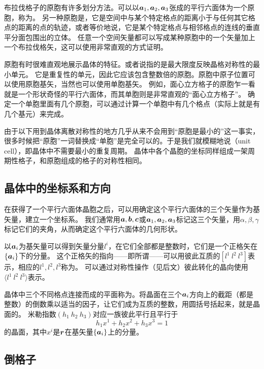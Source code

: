 布拉伐格子的原胞有许多划分方法。可以以$\vb*{a}_1, \vb*{a}_2, \vb*{a}_3$张成的平行六面体为一个原胞，称为。
另一种原胞是，它是空间中与某个特定格点的距离小于与任何其它格点的距离的点的轨迹，或者等价地说，它是某个特定格点与相邻格点的连线的垂直平分面包围出的立体。
任意一个空间矢量都可以写成某种原胞中的一个矢量加上一个布拉伐格矢，这可以使用非常直观的方式证明。

原胞有时很难直观地展示晶体的特征。或者说指的是最大限度反映晶格对称性的最小单元。
它是重复性的单元，因此它应该包含整数倍的原胞。原胞中原子位置可以使用原胞基矢，当然也可以使用单胞基矢。
例如，面心立方格子的原胞乍一看就是一个形状奇怪的平行六面体，而其单胞则是非常直观的“面心立方格子”。
确定一个单胞里面有几个原胞，可以通过计算一个单胞中有几个格点（实际上就是有几个基元）来完成。

由于以下用到晶体离散对称性的地方几乎从来不会用到“原胞是最小的”这一事实，很多时候把“原胞”一词替换成“单胞”是完全可以的。于是我们就模糊地说（unit cell），即晶体中不需要最小的重复周期。
晶体中各个晶胞的坐标同样组成一架周期性格子，和原胞组成的格子的对称性相同。

\subsection{晶体中的坐标系和方向}

在获得了一个平行六面体晶胞之后，可以用确定这个平行六面体的三个矢量作为基矢量，建立一个坐标系。
我们通常用$\vb*{a}, \vb*{b}, \vb*{c}$或$\vb*{a}_1, \vb*{a}_2, \vb*{a}_3$标记这三个矢量，用$\alpha, \beta, \gamma$标记它们的夹角，从而确定这个平行六面体的几何形状。

以$\vb*{a}_i$为基矢量可以得到矢量分量$l^i$，在它们全部都是整数时，它们是一个正格矢在$\{\vb*{a}_i\}$下的分量。
这个正格矢的指向——即所谓——可以用彼此互质的$[l^1 \  l^2 \  l^3]$表示，相应的$l^1, l^2, l^3$称为。
可以通过对称性操作（见后文）彼此转化的晶向使用$\langle l^1 \  l^2 \  l^3 \rangle$表示。

晶体中三个不同格点连接而成的平面称为。将晶面在三个$\vb*{a}_i$方向上的截距（都是整数）的倒数乘以适当的因子，让它们成为互质的整数，用圆括号括起来，就是晶面的。
米勒指数$(h_1 \ h_2 \ h_3)$对应一族彼此平行且平行于
\begin{equation}
    h_1 x^1 + h_2 x^2 + h_3 x^3 = 1
\end{equation}
的晶面，其中$x^i$是$\vb*{r}$在基矢量$\{\vb*{a}_i\}$上的分量。

\subsection{倒格子}

